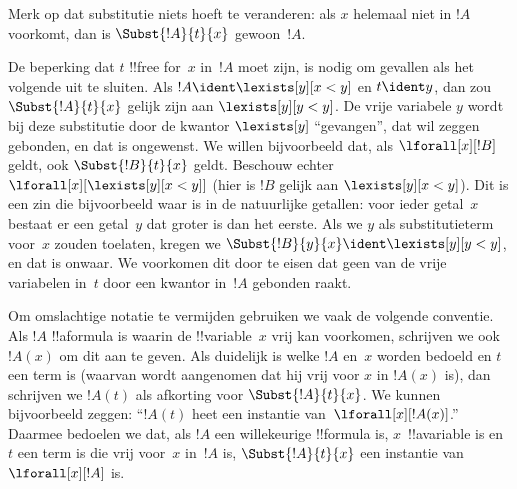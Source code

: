\documentclass[openany]{memoir}
\begin{document}
\begin{explain}
Merk op dat substitutie niets hoeft te veranderen: als $x$ helemaal
niet in $!A$ voorkomt, dan is $\Subst{!A}{t}{x}$ gewoon~$!A$.

De beperking dat $t$ !!{free for}~$x$ in~$!A$ moet zijn, is nodig om
gevallen als het volgende uit te sluiten. Als
$!A \ident \lexists[y][x < y]$ en $t \ident y$, dan zou
$\Subst{!A}{t}{x}$ gelijk zijn aan $\lexists[y][y < y]$. De vrije
variabele $y$ wordt bij deze substitutie door de kwantor
$\lexists[y]$ ``gevangen'', dat wil zeggen gebonden, en dat is
ongewenst. We willen bijvoorbeeld dat, als $\lforall[x][!B]$ geldt,
ook $\Subst{!B}{t}{x}$ geldt. Beschouw echter
$\lforall[x][\lexists[y][x < y]]$ (hier is $!B$ gelijk aan
$\lexists[y][x < y]$). Dit is een zin die bijvoorbeeld waar is in de
 natuurlijke getallen: voor ieder getal~$x$ bestaat er een getal~$y$
 dat groter is dan het eerste. Als we $y$ als substitutieterm voor~$x$ zouden
toelaten, kregen we
$\Subst{!B}{y}{x} \ident \lexists[y][y < y]$, en dat is onwaar. We
voorkomen dit door te eisen dat geen van de vrije variabelen in~$t$
door een kwantor in~$!A$ gebonden raakt.
\end{explain}

Om omslachtige notatie te vermijden gebruiken we vaak de volgende
conventie. Als $!A$ !!a{formula} is waarin de !!{variable}~$x$ vrij
kan voorkomen, schrijven we ook~$!A(x)$ om dit aan te geven. Als
duidelijk is welke $!A$ en~$x$ worden bedoeld en $t$ een term is
(waarvan wordt aangenomen dat hij vrij voor $x$ in $!A(x)$ is), dan
schrijven we $!A(t)$ als afkorting voor $\Subst{!A}{t}{x}$. We kunnen
bijvoorbeeld zeggen: ``$!A(t)$ heet een instantie
van~$\lforall[x][!A(x)]$.'' Daarmee bedoelen we dat, als $!A$ een
willekeurige !!{formula} is, $x$~!!a{variable} is en $t$ een term is
die vrij voor~$x$ in~$!A$ is, $\Subst{!A}{t}{x}$ een instantie van
$\lforall[x][!A]$ is.
\endgroup
\OLEndChapterHook

\begingroup
\def\olfilename{OLP-0159}
\def\olfilepath{content/first-order-logic/syntax-and-semantics/}
\hypertarget{unit-OLP-0159}{}
\end{document}
